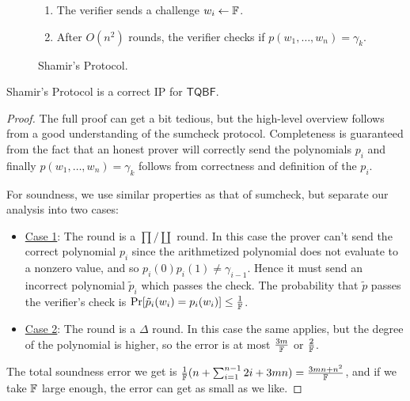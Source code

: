\begin{figure}[h]
\begin{mdframed}[
		linecolor=black,
		linewidth=1pt,
		roundcorner=5pt,
		backgroundcolor=white,
		userdefinedwidth=\textwidth,
		]
\begin{enumerate}
\begin{enumerate}
				\item If the quantifier is $\Delta$, it checks if $p_i(\mathbf{w}_{i-1})=\gamma_{i-1}$, where $\mathbf{w}_i=(w_1,\dots,w_i)$, since the degree-reduced polynomial should have the same evaluation.
			\end{enumerate}
			\item The verifier sends a challenge $w_{i}\leftarrow\mathbb{F}$.
			\item After $O(n^2)$ rounds, the verifier checks if $p(w_1,\dots,w_n)=\gamma_k$.
		\end{enumerate}
		\vspace{2mm}
	\end{mdframed}
	\caption{Shamir's Protocol.}
	\label{fig:4}
\end{figure}

\begin{theorem}
	\label{thm:shamir}
	Shamir's Protocol is a correct IP for $\mathsf{TQBF}$.
\end{theorem}

\begin{proof}
	The full proof can get a bit tedious, but the high-level overview follows from a good understanding of the sumcheck protocol. Completeness is guaranteed from the fact that an honest prover will correctly send the polynomials $p_i$ and finally $p(w_1,\dots,w_n)=\gamma_k$ follows from correctness and definition of the $p_i$.
	
	For soundness, we use similar properties as that of sumcheck, but separate our analysis into two cases:
	
	\begin{itemize}
		\item\underline{Case 1}: The round is a $\prod/\coprod$ round. In this case the prover can't send the correct polynomial $p_i$ since the arithmetized polynomial does not evaluate to a nonzero value, and so $p_i(0)p_i(1)\neq\gamma_{i-1}$. Hence it must send an incorrect polynomial $\tilde{p}_i$ which passes the check. The probability that $\tilde{p}$ passes the verifier's check is $\Pr[\tilde{p}_i(w_i)=p_i(w_i)]\leq\frac{1}{\mathbb{F}}$.
		\item\underline{Case 2}: The round is a $\Delta$ round. In this case the same applies, but the degree of the polynomial is higher, so the error is at most $\frac{3m}{\mathbb{F}}$ or $\frac{2}{\mathbb{F}}$.
	\end{itemize}

	The total soundness error we get is $\frac{1}{\mathbb{F}}(n+\sum_{i=1}^{n-1}2i+3mn)=\frac{3mn+n^2}{\mathbb{F}}$, and if we take $\mathbb{F}$ large enough, the error can get as small as we like.
\end{proof}

